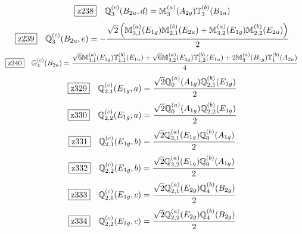 \documentclass[fleqn,10pt,landscape]{jsarticle}
\begin{document}
\begin{dmath*}
\hspace*{3mm}\fbox{z238}\quad \mathbb{Q}_{3}^{(c)}(B_{2u},d)=\mathbb{M}_{3}^{(a)}(A_{2g}) \mathbb{T}_{3}^{(b)}(B_{1u})
\end{dmath*}
\begin{dmath*}
\hspace*{3mm}\fbox{z239}\quad \mathbb{Q}_{3}^{(c)}(B_{2u},e)=- \frac{\sqrt{2} \left(\mathbb{M}_{3,1}^{(a)}(E_{1g}) \mathbb{M}_{2,1}^{(b)}(E_{2u}) + \mathbb{M}_{3,2}^{(a)}(E_{1g}) \mathbb{M}_{2,2}^{(b)}(E_{2u})\right)}{2}
\end{dmath*}
\begin{dmath*}
\hspace*{3mm}\fbox{z240}\quad \mathbb{G}_{4}^{(c)}(B_{2u})=\frac{\sqrt{6} \mathbb{M}_{3,1}^{(a)}(E_{2g}) \mathbb{T}_{1,1}^{(b)}(E_{1u}) + \sqrt{6} \mathbb{M}_{3,2}^{(a)}(E_{2g}) \mathbb{T}_{1,2}^{(b)}(E_{1u}) + 2 \mathbb{M}_{3}^{(a)}(B_{1g}) \mathbb{T}_{1}^{(b)}(A_{2u})}{4}
\end{dmath*}
\begin{dmath*}
\hspace*{3mm}\fbox{z329}\quad \mathbb{Q}_{2,1}^{(c)}(E_{1g},a)=\frac{\sqrt{2} \mathbb{Q}_{0}^{(a)}(A_{1g}) \mathbb{Q}_{2,1}^{(b)}(E_{1g})}{2}
\end{dmath*}
\begin{dmath*}
\hspace*{3mm}\fbox{z330}\quad \mathbb{Q}_{2,2}^{(c)}(E_{1g},a)=\frac{\sqrt{2} \mathbb{Q}_{0}^{(a)}(A_{1g}) \mathbb{Q}_{2,2}^{(b)}(E_{1g})}{2}
\end{dmath*}
\begin{dmath*}
\hspace*{3mm}\fbox{z331}\quad \mathbb{Q}_{2,1}^{(c)}(E_{1g},b)=\frac{\sqrt{2} \mathbb{Q}_{2,1}^{(a)}(E_{1g}) \mathbb{Q}_{0}^{(b)}(A_{1g})}{2}
\end{dmath*}
\begin{dmath*}
\hspace*{3mm}\fbox{z332}\quad \mathbb{Q}_{2,2}^{(c)}(E_{1g},b)=\frac{\sqrt{2} \mathbb{Q}_{2,2}^{(a)}(E_{1g}) \mathbb{Q}_{0}^{(b)}(A_{1g})}{2}
\end{dmath*}
\begin{dmath*}
\hspace*{3mm}\fbox{z333}\quad \mathbb{Q}_{2,1}^{(c)}(E_{1g},c)=\frac{\sqrt{2} \mathbb{Q}_{2,1}^{(a)}(E_{2g}) \mathbb{Q}_{4}^{(b)}(B_{2g})}{2}
\end{dmath*}
\begin{dmath*}
\hspace*{3mm}\fbox{z334}\quad \mathbb{Q}_{2,2}^{(c)}(E_{1g},c)=\frac{\sqrt{2} \mathbb{Q}_{2,2}^{(a)}(E_{2g}) \mathbb{Q}_{4}^{(b)}(B_{2g})}{2}
\end{dmath*}
\end{document}
